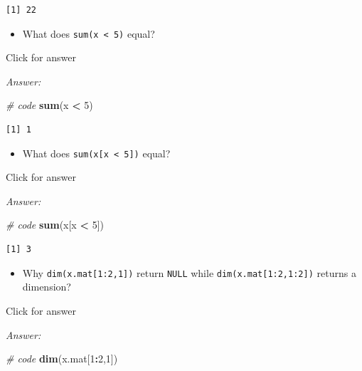 \documentclass[
]{book}
\newenvironment{Shaded}{\begin{snugshade}}{\end{snugshade}}
\newcommand{\CommentTok}[1]{\textcolor[rgb]{0.56,0.35,0.01}{\textit{#1}}}
\newcommand{\DecValTok}[1]{\textcolor[rgb]{0.00,0.00,0.81}{#1}}
\newcommand{\FunctionTok}[1]{\textcolor[rgb]{0.13,0.29,0.53}{\textbf{#1}}}
\newcommand{\NormalTok}[1]{#1}
\newcommand{\SpecialCharTok}[1]{\textcolor[rgb]{0.81,0.36,0.00}{\textbf{#1}}}
\providecommand{\tightlist}{%
  \setlength{\itemsep}{0pt}\setlength{\parskip}{0pt}}
\begin{document}
\begin{verbatim}
[1] 22
\end{verbatim}

\begin{itemize}
\tightlist
\item
  What does \texttt{sum(x\ \textless{}\ 5)} equal?
\end{itemize}

Click for answer

\emph{Answer:}

\begin{Shaded}
\begin{Highlighting}[]
\CommentTok{\# code}
\FunctionTok{sum}\NormalTok{(x }\SpecialCharTok{\textless{}} \DecValTok{5}\NormalTok{)}
\end{Highlighting}
\end{Shaded}

\begin{verbatim}
[1] 1
\end{verbatim}

\begin{itemize}
\tightlist
\item
  What does \texttt{sum(x{[}x\ \textless{}\ 5{]})} equal?
\end{itemize}

Click for answer

\emph{Answer:}

\begin{Shaded}
\begin{Highlighting}[]
\CommentTok{\# code}
\FunctionTok{sum}\NormalTok{(x[x }\SpecialCharTok{\textless{}} \DecValTok{5}\NormalTok{])}
\end{Highlighting}
\end{Shaded}

\begin{verbatim}
[1] 3
\end{verbatim}

\begin{itemize}
\tightlist
\item
  Why \texttt{dim(x.mat{[}1:2,1{]})} return \texttt{NULL} while \texttt{dim(x.mat{[}1:2,1:2{]})} returns a dimension?
\end{itemize}

Click for answer

\emph{Answer:}

\begin{Shaded}
\begin{Highlighting}[]
\CommentTok{\# code}
\FunctionTok{dim}\NormalTok{(x.mat[}\DecValTok{1}\SpecialCharTok{:}\DecValTok{2}\NormalTok{,}\DecValTok{1}\NormalTok{])}
\end{Highlighting}
\end{Shaded}
\end{document}
